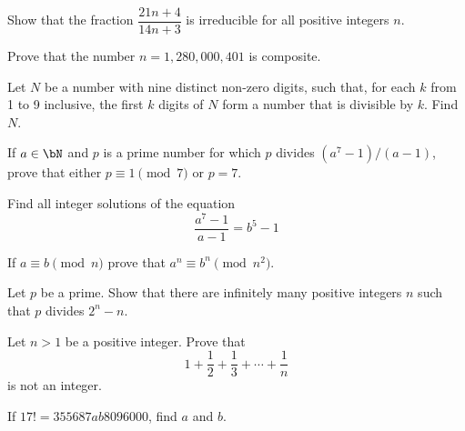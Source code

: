 \documentclass[12pt]{article}
\begin{document}
        \begin{exercise}
            Show that the fraction \(\dfrac{21n+4}{14n+3}\) is irreducible for all positive integers \(n\).
        \end{exercise}
    
        \begin{exercise}
            Prove that the number \(n=1,280,000,401\) is composite.
        \end{exercise}
    
        \begin{exercise}
            Let \(N\) be a number with nine distinct non-zero digits, such that, for each \(k\) from 1 to 9 inclusive, the first \(k\) digits of \(N\) form a number that is divisible by \(k\). 
            Find \(N\).
        \end{exercise}
        
        \begin{exercise}
            If $a\in \bN$ and $p$ is a prime number for which $p$ divides $(a^7-1)/(a-1)$, prove that either $p \equiv 1 \pmod{7}$ or $p=7$.
        \end{exercise}
        
        \begin{exercise}
            Find all integer solutions of the equation
            \[\frac{a^7-1}{a-1} = b^5-1\]
        \end{exercise}
        
        \begin{exercise}
            If $a\equiv b \pmod{n}$ prove that $a^n \equiv b^n \pmod{n^2}$.
        \end{exercise}
        
        \begin{exercise}
            Let $p$ be a prime. Show that there are infinitely many positive integers $n$ such that $p$ divides $2^n-n$.
        \end{exercise}
        
        \begin{exercise}
            Let $n>1$ be a positive integer. Prove that 
            \[1+\frac{1}{2}+\frac{1}{3}+\cdots + \frac{1}{n}\] is not an integer.
        \end{exercise}

        \begin{exercise}
            If \(17!=355687ab8096000\), find \(a\) and \(b\).
        \end{exercise}
    
\end{document}
